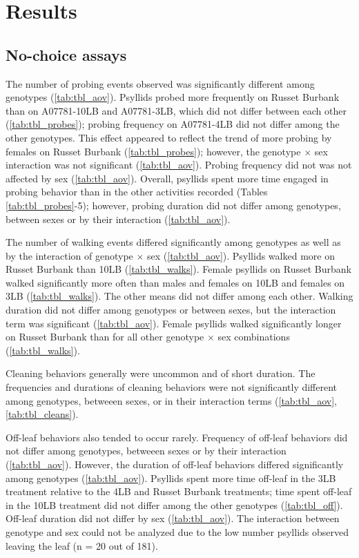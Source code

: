 \documentclass{UIdahoMastersThesis}
\begin{document}

\chapter{Results}
\label{ch:results}

\section{No-choice assays}
\label{sec:results_no-choice}
The number of probing events observed was significantly different among genotypes (\autoref{tab:tbl_aov}). Psyllids probed more frequently on Russet Burbank than on A07781-10LB and A07781-3LB, which did not differ between each other (\autoref{tab:tbl_probes}); probing frequency on A07781-4LB did not differ among the other genotypes. This effect appeared to reflect the trend of more probing by females on Russet Burbank (\autoref{tab:tbl_probes}); however, the genotype $\times$ sex interaction was not significant (\autoref{tab:tbl_aov}). Probing frequency did not was not affected by sex (\autoref{tab:tbl_aov}). Overall, psyllids spent more time engaged in probing behavior than in the other activities recorded (Tables \ref{tab:tbl_probes}-5); however, probing duration did not differ among genotypes, between sexes or by their interaction (\autoref{tab:tbl_aov}).

The number of walking events differed significantly among genotypes as well as by the interaction of genotype $\times$ sex (\autoref{tab:tbl_aov}). Psyllids walked more on Russet Burbank than 10LB (\autoref{tab:tbl_walks}). Female psyllids on Russet Burbank walked significantly more often than males and females on 10LB and females on 3LB (\autoref{tab:tbl_walks}). The other means did not differ among each other. Walking duration did not differ among genotypes or between sexes, but the interaction term was significant (\autoref{tab:tbl_aov}). Female psyllids walked significantly longer on Russet Burbank than for all other genotype $\times$ sex combinations (\autoref{tab:tbl_walks}).

Cleaning behaviors generally were uncommon and of short duration. The frequencies and durations of cleaning behaviors were not significantly different among genotypes, betweeen sexes, or in their interaction terms (\autoref{tab:tbl_aov}, \autoref{tab:tbl_cleans}).

Off-leaf behaviors also tended to occur rarely. Frequency of off-leaf behaviors did not differ among genotypes, betweeen sexes or by their interaction (\autoref{tab:tbl_aov}). However, the duration of off-leaf behaviors differed significantly among genotypes (\autoref{tab:tbl_aov}). Psyllids spent more time off-leaf in the 3LB treatment relative to the 4LB and Russet Burbank treatments; time spent off-leaf in the 10LB treatment did not differ among the other genotypes (\autoref{tab:tbl_off}). Off-leaf duration did not differ by sex (\autoref{tab:tbl_aov}). The interaction between genotype and sex could not be analyzed due to the low number psyllids observed leaving the leaf (n = 20 out of 181).
\end{document}
